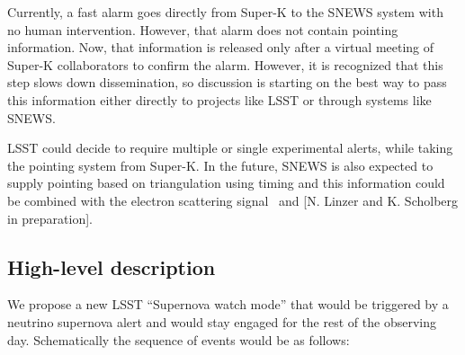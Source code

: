 \documentclass[12pt, letterpaper]{article}
\newcommand{\superk}  {Super\nobreakdash-K\xspace}
\begin{document}
Currently, a fast alarm goes directly from \superk to the SNEWS system
with no human intervention.  However, that alarm does not contain
pointing information.  Now, that information is released only after a
virtual meeting of \superk collaborators to confirm the alarm.
However, it is recognized that this step slows down dissemination, so
discussion is starting on the best way to pass this information either
directly to projects like LSST or through systems like SNEWS.

LSST could decide to require multiple or single experimental alerts,
while taking the pointing system from \superk.  In the future, SNEWS
is also expected to supply pointing based on triangulation using
timing and this information could be combined with the electron
scattering signal~\cite{2018JCAP...04..025B} and [N. Linzer and
K. Scholberg in preparation].

\subsection{High-level description}

We propose a new LSST ``Supernova watch mode'' that would be triggered by a
neutrino supernova alert and would stay engaged for the rest of the
observing day.  Schematically the sequence of events would be as follows:
\end{document}
